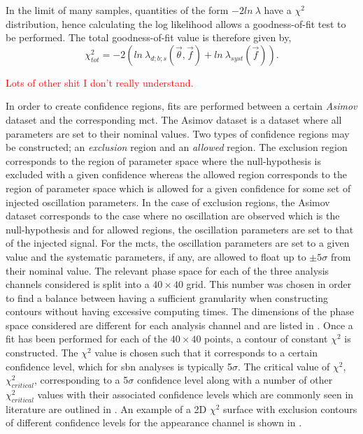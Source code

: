 In the limit of many samples, quantities of the form $-2ln~\lambda$ have a $\chi^2$ distribution, hence calculating the log likelihood allows a goodness-of-fit test to be performed. The total goodness-of-fit value is therefore given by,
\begin{equation}
    \chi^2_{tot} = -2(ln~\lambda_{d;b;s}(\vec{\theta}, \vec{f}) + ln~\lambda_{syst}(\vec{f})).
\end{equation}

\textcolor{red}{Lots of other shit I don't really understand.}


In order to create confidence regions, fits are performed between a certain \textit{Asimov} dataset and the corresponding \gls{mct}. The Asimov dataset is a dataset where all parameters are set to their nominal values. Two types of confidence regions may be constructed; an \textit{exclusion} region and an \textit{allowed} region. The exclusion region corresponds to the region of parameter space where the null-hypothesis is excluded with a given confidence whereas the allowed region corresponds to the region of parameter space which is allowed for a given confidence for some set of injected oscillation parameters. In the case of exclusion regions, the Asimov dataset corresponds to the case where no oscillation are observed which is the null-hypothesis and for allowed regions, the oscillation parameters are set to that of the injected signal.  For the \glspl{mct}, the oscillation parameters are set to a given value and the systematic parameters, if any, are allowed to float up to $\pm5\sigma$ from their nominal value. The relevant phase space for each of the three analysis channels considered is split into a $40 \times 40$ grid. This number was chosen in order to find a balance between having a sufficient granularity when constructing contours without having excessive computing times. The dimensions of the phase space considered are different for each analysis channel and are listed in . Once a fit has been performed for each of the $40 \times 40$ points, a contour of constant $\chi^2$ is constructed. The $\chi^2$ value is chosen such that it corresponds to a certain confidence level, which for \gls{sbn} analyses is typically 5$\sigma$. The critical value of $\chi^2$, $\chi^2_{critical}$, corresponding to a 5$\sigma$ confidence level along with a number of other $\chi^2_{critical}$ values with their associated confidence levels which are commonly seen in literature are outlined in . An example of a 2D $\chi^2$ surface with exclusion contours of different confidence levels for the \nue appearance channel is shown in .

